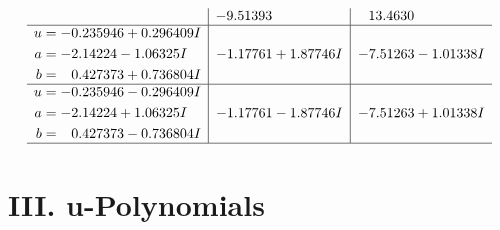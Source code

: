 \documentclass[1p]{elsarticle_modified}
\theoremstyle{definition}
\begin{document}
$$\begin{array}{c|c|c}
 & -9.51393\phantom{ +0.000000I} & \phantom{-}13.4630\phantom{ +0.000000I} \\ \hline\begin{aligned}
u &= -0.235946 + 0.296409 I \\
a &= -2.14224 - 1.06325 I \\
b &= \phantom{-}0.427373 + 0.736804 I\end{aligned}
 & -1.17761 + 1.87746 I & -7.51263 - 1.01338 I \\ \hline\begin{aligned}
u &= -0.235946 - 0.296409 I \\
a &= -2.14224 + 1.06325 I \\
b &= \phantom{-}0.427373 - 0.736804 I\end{aligned}
 & -1.17761 - 1.87746 I & -7.51263 + 1.01338 I\\
 \hline 
 \end{array}$$\newpage
\newpage\renewcommand{\arraystretch}{1}
\centering \section*{ III. u-Polynomials}
\end{document}
